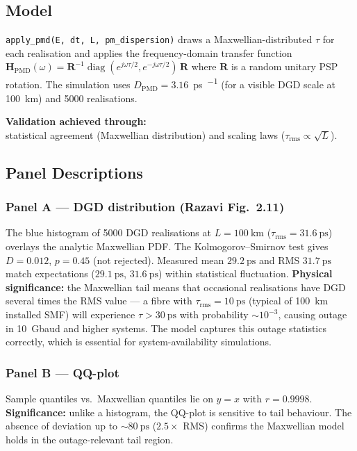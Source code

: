 ﻿\documentclass[11pt,a4paper]{article}
\newcommand{\code}[1]{\texttt{#1}}
\begin{document}
\subsection{Model}
\code{apply\_pmd(E, dt, L, pm\_dispersion)} draws a Maxwellian-distributed
$\tau$ for each realisation and applies the frequency-domain transfer
function $\mathbf{H}_\text{PMD}(\omega) = \mathbf{R}^{-1}
\operatorname{diag}(e^{j\omega\tau/2}, e^{-j\omega\tau/2})\,\mathbf{R}$
where $\mathbf{R}$ is a random unitary PSP rotation.  The simulation uses
$D_\text{PMD} = 3.16$~\si{\ps\per\sqrt{\km}} (for a visible DGD scale at
100~km) and 5000 realisations.

\medskip
\noindent\textbf{Validation achieved through:}\\
statistical agreement (Maxwellian distribution) and scaling laws
($\tau_\text{rms} \propto \sqrt{L}$).

\subsection{Panel Descriptions}

\subsubsection*{Panel A --- DGD distribution (Razavi Fig.~2.11)}
The blue histogram of 5000 DGD realisations at $L = \SI{100}{\km}$
($\tau_\text{rms} = \SI{31.6}{\ps}$) overlays the analytic Maxwellian PDF.
The Kolmogorov--Smirnov test gives $D = 0.012$, $p = 0.45$ (not rejected).
Measured mean $\SI{29.2}{\ps}$ and RMS $\SI{31.7}{\ps}$ match expectations
($\SI{29.1}{\ps}$, $\SI{31.6}{\ps}$) within statistical fluctuation.
\textbf{Physical significance:} the Maxwellian tail means that occasional
realisations have DGD several times the RMS value --- a fibre with
$\tau_\text{rms} = \SI{10}{\ps}$ (typical of 100~km installed SMF) will
experience $\tau > \SI{30}{\ps}$ with probability $\sim\!10^{-3}$, causing
outage in 10~Gbaud and higher systems.  The model captures this outage
statistics correctly, which is essential for system-availability
simulations.

\subsubsection*{Panel B --- QQ-plot}
Sample quantiles vs.\ Maxwellian quantiles lie on $y = x$ with
$r = 0.9998$.  \textbf{Significance:} unlike a histogram, the QQ-plot is
sensitive to tail behaviour.  The absence of deviation up to
$\sim\!\SI{80}{\ps}$ ($2.5\times$ RMS) confirms the Maxwellian model holds
in the outage-relevant tail region.
\end{document}
